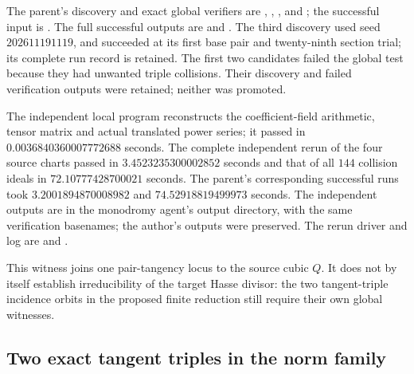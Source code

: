 \begin{remark}\label{auto:A_monodromy:0638c557453d}

The parent's discovery and exact global verifiers are
,
,
, and
; the successful input is
. The full successful outputs are
 and
.
The third discovery used seed $202611191119$, and succeeded at its
first base pair and twenty-ninth section trial; its complete run
record is retained. The first two candidates failed the global test
because they had unwanted triple collisions. Their discovery and
failed verification outputs were retained; neither was promoted.

The independent local program
reconstructs the coefficient-field arithmetic, tensor matrix and
actual translated power series; it passed in
$0.0036840360007772688$ seconds.
The complete independent rerun of the four source charts passed in
$3.4523235300002852$ seconds and that of all $144$ collision ideals in
$72.10777428700021$ seconds. The parent's corresponding successful
runs took $3.2001894870008982$ and $74.52918819499973$ seconds.
The independent outputs are in the monodromy agent's output directory,
with the same verification basenames; the author's outputs were
preserved. The rerun driver and log are
 and
.

This witness joins one pair-tangency locus to the source cubic $Q$.
It does not by itself establish irreducibility of the target Hasse
divisor: the two tangent-triple incidence orbits in the proposed
finite reduction still require their own global witnesses.
\end{remark}


\subsection{Two exact tangent triples in the norm family}
\label{subsec:ss-global-tangent-triples}


